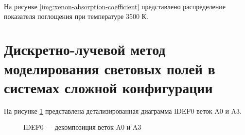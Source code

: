 На рисунке \ref{img:xenon-absorption-coefficient} представлено распределение показателя поглощения при температуре 3500 К.

\section{Дискретно-лучевой метод моделирования световых полей в системах сложной конфигурации}

На рисунке \ref{img:02_A0_03_A3} представлена детализированная диаграмма IDEF0 веток A0 и A3.

\begin{figure}[p]
	\captionsetup{justification=centering}
	\caption{IDEF0 — декомпозиция веток A0 и A3}
	\label{img:02_A0_03_A3}
\end{figure}


